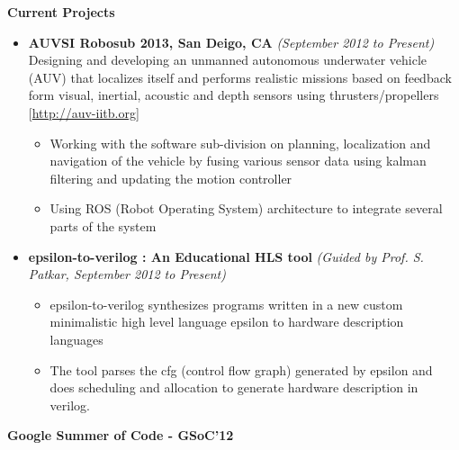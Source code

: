 \documentclass[a4paper,11pt]{article}
\newcommand{\isep}{-2 pt}
\newcommand{\resheading}[1]{{\small \colorbox{mygrey}{\begin{minipage}{0.975\textwidth}{\textbf{#1 \vphantom{p\^{E}}}}\end{minipage}}}}
\begin{document}
\resheading{\textbf{\large{Current Projects}}}
\begin{itemize}
    \item \textbf{AUVSI Robosub 2013, San Deigo, CA} \hfill \emph{(September 2012 to Present) } \\
	Designing and developing an unmanned autonomous underwater vehicle (AUV) that localizes itself and performs realistic missions based on feedback form visual, inertial, acoustic and depth sensors using thrusters/propellers \hfill  [\url{http://auv-iitb.org}]
        \begin{itemize}
            \item Working with the software sub-division on planning, localization and navigation of the vehicle  by fusing various sensor data using kalman filtering and updating the motion controller
            \item Using ROS (Robot Operating System) architecture to integrate several parts of the system
        \end{itemize}
    \item \textbf{ epsilon-to-verilog : An Educational HLS tool} \hfill \emph{(Guided by Prof. S. Patkar, September 2012 to Present) }  \\[-0.6cm]
    \begin{itemize} \itemsep \isep
    	\item epsilon-to-verilog synthesizes programs written in a new custom minimalistic high level language epsilon to hardware description languages
        \item The tool parses the cfg (control flow graph) generated by epsilon and does scheduling and allocation to generate hardware description in verilog.
   \end{itemize}

\end{itemize}

\resheading{\textbf{\large Google Summer of Code - GSoC'12}} \\
\end{document}
